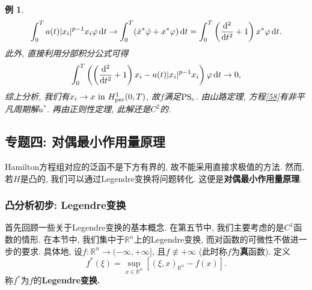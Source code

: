 \documentclass[12pt,a4paper]{article}
\newtheorem{example}[theorem]{例}
\begin{document}
\begin{example}
    \begin{equation*}
        \int_0^Ta(t)|x_i|^{p - 1}x_i\varphi \,{\rm d}t \rightarrow \int_0^T(\dot x^*\dot\varphi + x^*\varphi) \,{\rm d}t = \int_0^T\left(\frac{{\rm d}^2}{{\rm d}t^2} + 1\right)x^*\varphi \,{\rm d}t.
    \end{equation*}
    此外, 直接利用分部积分公式可得
    \begin{equation*}
        \int_0^T\left(\left(\frac{{\rm d}^2}{{\rm d}t^2} + 1\right)x_i - a(t)|x_i|^{p - 1}x_i\right)\varphi \,{\rm d}t \rightarrow 0,
    \end{equation*}
    综上分析, 我们有$x_i \rightarrow x\ {\rm in}\ H_{{\rm per}}^1(0, T)$, 故$f$满足${\rm PS_c}$.
    由山路定理, 方程\eqref{58}有非平凡周期解$u^*$. 再由正则性定理, 此解还是$C^2$的.
\end{example}

\subsection{专题四: 对偶最小作用量原理}

Hamilton方程组对应的泛函不是下方有界的, 故不能采用直接求极值的方法. 然而, 若$H$是凸的, 我们可以通过Legendre变换将问题转化.
这便是\textbf{对偶最小作用量原理}.

\subsubsection{凸分析初步: Legendre变换}

首先回顾一些关于Legendre变换的基本概念. 在第五节中, 我们主要考虑的是$C^1$函数的情形.
在本节中, 我们集中于$\mathbb{R}^n$上的Legendre变换, 而对函数的可微性不做进一步的要求.
具体地, 设$f\colon \mathbb{R}^n \rightarrow (-\infty, +\infty]$, 且$f \not\equiv +\infty$ (此时称$f$为\textbf{真}函数).
定义 
\begin{equation*}
    \boxed{f^*(\xi) = \sup_{x \in \mathbb{R}^n}[(\xi, x)_{\mathbb{R}^n} - f(x)]}.
\end{equation*}
称$f^*$为$f$的\textbf{Legendre变换.}
\end{document}
